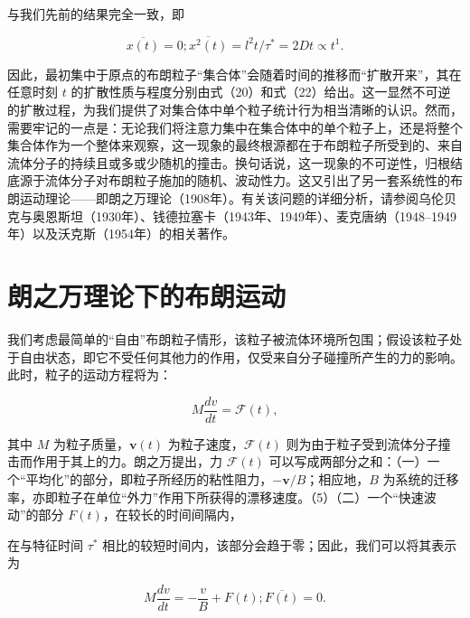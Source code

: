 与我们先前的结果完全一致，即

\begin{equation}\tag{15.2.23}\label{eq:15.2.23}
\overline { { x ( t ) } } = 0 ;  \overline { { x ^{2} ( t ) } } = l ^{2} t / \tau ^{*} = 2 D t \propto t ^{1} .
\end{equation}

因此，最初集中于原点的布朗粒子``集合体''会随着时间的推移而``扩散开来''，其在任意时刻 \(t\) 的扩散性质与程度分别由式（20）和式（22）给出。这一显然不可逆的扩散过程，为我们提供了对集合体中单个粒子统计行为相当清晰的认识。然而，需要牢记的一点是：无论我们将注意力集中在集合体中的单个粒子上，还是将整个集合体作为一个整体来观察，这一现象的最终根源都在于布朗粒子所受到的、来自流体分子的持续且或多或少随机的撞击。换句话说，这一现象的不可逆性，归根结底源于流体分子对布朗粒子施加的随机、波动性力。这又引出了另一套系统性的布朗运动理论------即朗之万理论（1908年）。有关该问题的详细分析，请参阅乌伦贝克与奥恩斯坦（1930年）、钱德拉塞卡（1943年、1949年）、麦克唐纳（1948--1949年）以及沃克斯（1954年）的相关著作。

\section{朗之万理论下的布朗运动}\label{ux6717ux4e4bux4e07ux7406ux8bbaux4e0bux7684ux5e03ux6717ux8fd0ux52a8}

我们考虑最简单的``自由''布朗粒子情形，该粒子被流体环境所包围；假设该粒子处于自由状态，即它不受任何其他力的作用，仅受来自分子碰撞所产生的力的影响。此时，粒子的运动方程将为：

\begin{equation}\tag{15.3.1}\label{eq:15.3.1}
M { \frac { d v } { d t } } = { \mathcal { F } } ( t ) ,
\end{equation}

其中 \(M\) 为粒子质量，\(\boldsymbol{v}(t)\) 为粒子速度，\(\mathcal{F}(t)\) 则为由于粒子受到流体分子撞击而作用于其上的力。朗之万提出，力 \(\mathcal{F}(t)\) 可以写成两部分之和：（一）一个``平均化''的部分，即粒子所经历的粘性阻力，\(-\boldsymbol{v}/B\)；相应地，\(B\) 为系统的迁移率，亦即粒子在单位``外力''作用下所获得的漂移速度。（5）（二）一个``快速波动''的部分 \(F(t)\)，在较长的时间间隔内，

在与特征时间 \(\tau^{*}\) 相比的较短时间内，该部分会趋于零；因此，我们可以将其表示为

\begin{equation}\tag{15.3.2}\label{eq:15.3.2}
M { \frac { d v } { d t } } = - { \frac { v } { B } } + F ( t ) ;  { \overline { { F ( t ) } } } = 0 .
\end{equation}

